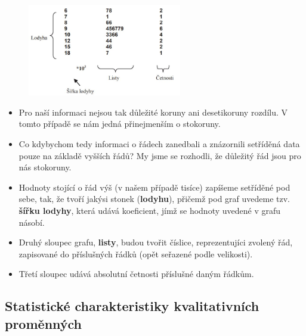 \begin{itemize}
\begin{itemize}
\begin{table}[H]
\begin{tabular}{|l|}
	\end{tabular}
\end{table}
				\begin{figure}[H]
				\centering
				\includegraphics[width=0.6\textwidth]{assets/13_cislicovy_hist}
				\end{figure}
		\begin{itemize}
		 \item Pro naší informaci nejsou tak důležité koruny ani desetikoruny rozdílu. V tomto případě se nám jedná přinejmenším o stokoruny.
		 \item Co kdybychom tedy informaci o  řádech zanedbali a znázornili setříděná data pouze na základě vyšších řádů? My jsme se rozhodli, že důležitý řád jsou pro nás stokoruny.
		 \item Hodnoty stojící o řád výš (v našem případě tisíce) zapíšeme setříděné pod sebe, tak, že tvoří jakýsi stonek (\textbf{lodyhu}), přičemž pod graf uvedeme tzv. \textbf{šířku lodyhy}, která udává koeficient, jímž se hodnoty uvedené v grafu násobí.
		 \item Druhý sloupec grafu, \textbf{listy}, budou tvořit číslice, reprezentujíci zvolený  řád, zapisované do příslušných řádků (opět seřazené podle velikosti).
		 \item Třetí sloupec udává absolutní četnosti příslušné daným řádkům.
		\end{itemize}
	\end{itemize}
\end{itemize}

\subsection{Statistické charakteristiky kvalitativních proměnných}
